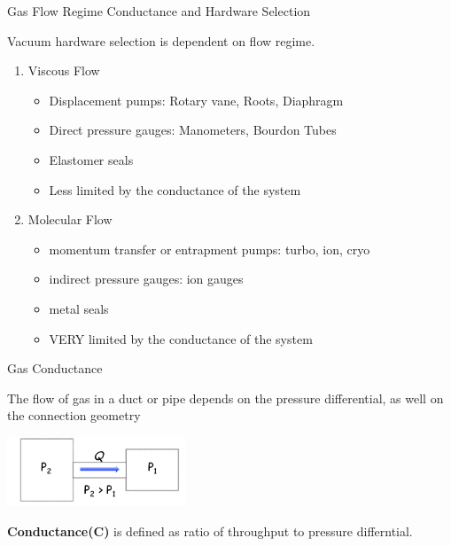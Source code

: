 \documentclass[11]{beamer}
\begin{document}
\begin{frame}{Gas Flow Regime Conductance and Hardware Selection}

Vacuum hardware selection is dependent on flow regime.
\begin{enumerate}
\item Viscous Flow
	\begin{itemize}
	\item  Displacement pumps:  Rotary vane, Roots, Diaphragm
	\item  Direct pressure gauges:  Manometers, Bourdon Tubes
    \item  Elastomer seals
    \item  Less limited by the conductance of the system

	\end{itemize}
	

\item Molecular Flow

    \begin{itemize}
	\item  momentum transfer or entrapment pumps:  turbo, ion, cryo
	\item  indirect pressure gauges:  ion gauges
    \item  metal seals
    \item  VERY limited by the conductance of the system

	\end{itemize}



\end{enumerate}

		


\end{frame}









\begin{frame}{Gas Conductance}

The flow of gas in a duct or pipe depends on the pressure differential, as well on the connection geometry
	
	\begin{center}
		\includegraphics[width=0.4\textwidth]{Conductance.png}	
	\end{center}
\textbf{Conductance(C)} is defined as ratio of throughput to pressure differntial. \break

\begin{center}
\end{center}


\end{frame}
\end{document}
